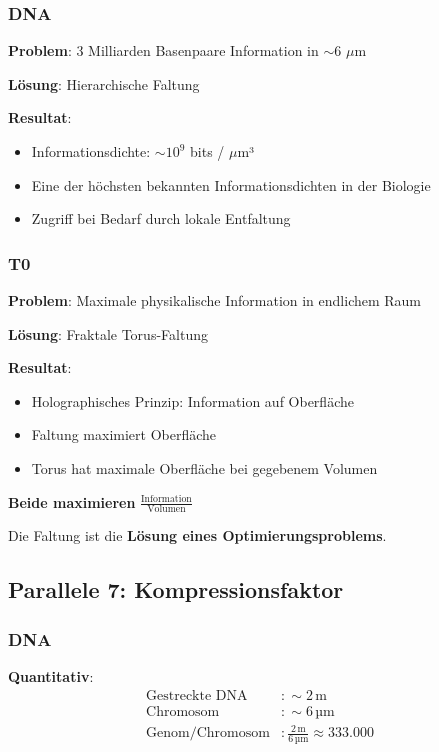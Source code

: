 	\subsubsection{DNA}

	\textbf{Problem}: 3 Milliarden Basenpaare Information in $\sim$6 $\mu$m

	\textbf{Lösung}: Hierarchische Faltung

	\textbf{Resultat}:
	\begin{itemize}
		\item Informationsdichte: $\sim 10^{9}$ bits / $\mu$m³
		\item Eine der höchsten bekannten Informationsdichten in der Biologie
		\item Zugriff bei Bedarf durch lokale Entfaltung
	\end{itemize}

	\subsubsection{T0}

	\textbf{Problem}: Maximale physikalische Information in endlichem Raum

	\textbf{Lösung}: Fraktale Torus-Faltung

	\textbf{Resultat}:
	\begin{itemize}
		\item Holographisches Prinzip: Information auf Oberfläche
		\item Faltung maximiert Oberfläche
		\item Torus hat maximale Oberfläche bei gegebenem Volumen
	\end{itemize}

	\begin{keyresult}
		\textbf{Beide maximieren} $\frac{\text{Information}}{\text{Volumen}}$

		Die Faltung ist die \textbf{Lösung eines Optimierungsproblems}.
	\end{keyresult}

	\subsection{Parallele 7: Kompressionsfaktor}

	\subsubsection{DNA}

	\textbf{Quantitativ}:
	\begin{align}
		\text{Gestreckte DNA} &: \sim 2\,\text{m} \\
		\text{Chromosom} &: \sim 6\,\text{µm} \\
		\text{Genom/Chromosom} &: \frac{2\,\text{m}}{6\,\text{µm}} \approx 333{.}000
	\end{align}

